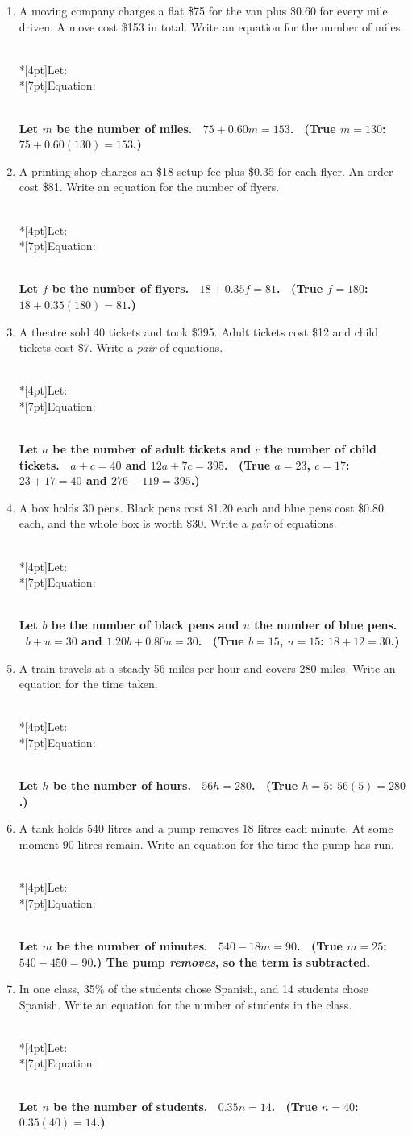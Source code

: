 \documentclass[11pt,a4paper]{article}
\newif\ifANSWERS
\newcommand{\ans}[1]{\ {\color{keyred}\bfseries #1}}
\newcommand{\ans}[1]{}
\newcommand{\setuplines}{%
  \ifANSWERS\else
  \\*[4pt]\hspace*{4pt}Let: \underline{\hspace{0.80\linewidth}}%
  \\*[7pt]\hspace*{4pt}Equation: \underline{\hspace{0.72\linewidth}}%
  \fi
}
\begin{document}
\begin{enumerate}[leftmargin=20pt,itemsep=7pt]
\item A moving company charges a flat \$75 for the van plus \$0.60 for every mile
  driven. A move cost \$153 in total. Write an equation for the number of miles.
  \setuplines
  \ans{\\ Let $m$ be the number of miles. \ $75+0.60m=153$. \ (True $m=130$:
  $75+0.60(130)=153$.)}

\item A printing shop charges an \$18 setup fee plus \$0.35 for each flyer. An order
  cost \$81. Write an equation for the number of flyers.
  \setuplines
  \ans{\\ Let $f$ be the number of flyers. \ $18+0.35f=81$. \ (True $f=180$:
  $18+0.35(180)=81$.)}

\item A theatre sold 40 tickets and took \$395. Adult tickets cost \$12 and child
  tickets cost \$7. Write a \emph{pair} of equations.
  \setuplines
  \ans{\\ Let $a$ be the number of adult tickets and $c$ the number of child tickets.
  \ $a+c=40$ and $12a+7c=395$. \ (True $a=23$, $c=17$: $23+17=40$ and
  $276+119=395$.)}

\item A box holds 30 pens. Black pens cost \$1.20 each and blue pens cost \$0.80 each,
  and the whole box is worth \$30. Write a \emph{pair} of equations.
  \setuplines
  \ans{\\ Let $b$ be the number of black pens and $u$ the number of blue pens.
  \ $b+u=30$ and $1.20b+0.80u=30$. \ (True $b=15$, $u=15$: $18+12=30$.)}

\item A train travels at a steady 56 miles per hour and covers 280 miles. Write an
  equation for the time taken.
  \setuplines
  \ans{\\ Let $h$ be the number of hours. \ $56h=280$. \ (True $h=5$: $56(5)=280$.)}

\item A tank holds 540 litres and a pump removes 18 litres each minute. At some moment
  90 litres remain. Write an equation for the time the pump has run.
  \setuplines
  \ans{\\ Let $m$ be the number of minutes. \ $540-18m=90$. \ (True $m=25$:
  $540-450=90$.) The pump \emph{removes}, so the term is subtracted.}

\item In one class, 35\% of the students chose Spanish, and 14 students chose Spanish.
  Write an equation for the number of students in the class.
  \setuplines
  \ans{\\ Let $n$ be the number of students. \ $0.35n=14$. \ (True $n=40$:
  $0.35(40)=14$.)}


\end{enumerate}
\end{document}
